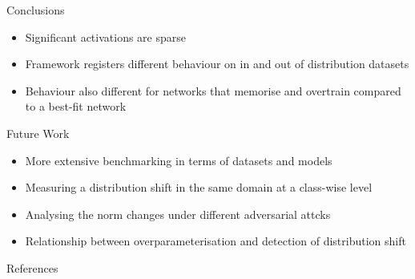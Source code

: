 \documentclass{beamer}
\begin{document}
    \begin{frame}{Conclusions}
        \begin{itemize}
            \setlength\itemsep{1em}
            \item 
                Significant activations are sparse
            \item 
                Framework registers different behaviour on in and out of distribution datasets
            \item 
                Behaviour also different for networks that memorise and overtrain compared to a best-fit network
        \end{itemize}
    \end{frame}
    
    \begin{frame}{Future Work}
        \begin{itemize}
            \setlength\itemsep{1em}
            \item 
                More extensive benchmarking in terms of datasets and models
            \item 
                Measuring a distribution shift in the same domain at a class-wise level
            \item 
                Analysing the norm changes under different adversarial attcks 
            \item 
                Relationship between overparameterisation and detection of distribution shift
        \end{itemize}
    \end{frame}

    \begin{frame}[allowframebreaks]{References}
        \printbibliography
    \end{frame}
        
\end{document}
